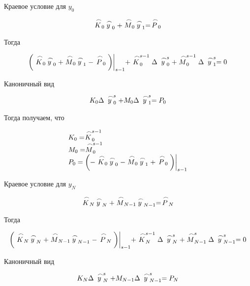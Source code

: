 \begin{enumerate}
    Краевое условие для $y_0$

    \begin{equation*}
        \LittleCap{K}_0 \LittleCap{y}_0 + \LittleCap{M}_0 \LittleCap{y}_1 = \LittleCap{P}_0
    \end{equation*}

    Тогда

    \begin{equation*}
        \bigg( \LittleCap{K}_0 \LittleCap{y}_0 + \LittleCap{M}_0 \LittleCap{y}_1 - \LittleCap{P}_0 \bigg) \bigg|_{s-1} + \LittleCap{K}_0^{s-1} \Delta \LittleCap{y}_0^s + \LittleCap{M}_0^{s-1}\Delta \LittleCap{y}_1^s = 0
    \end{equation*}

    Каноничный вид

    \begin{equation*}
        K_0 \Delta \LittleCap{y}_0^s + M_0 \Delta \LittleCap{y}_1^s = P_0
    \end{equation*}

    Тогда получаем, что

    \begin{equation*}
        \begin{matrix*}[l]
            K_0 = \LittleCap{K}_0^{s-1} \\
            M_0 = \LittleCap{M}_0^{s-1} \\
            P_0 = \bigg( - \LittleCap{K}_0 \LittleCap{y}_0 - \LittleCap{M}_0 \LittleCap{y}_1 + \LittleCap{P}_0 \bigg) \bigg|_{s-1} \\
        \end{matrix*}
    \end{equation*}

    Краевое условие для $y_N$

    \begin{equation*}
        \LittleCap{K}_N \LittleCap{y}_N + \LittleCap{M}_{N-1} \LittleCap{y}_{N-1} = \LittleCap{P}_N
    \end{equation*}

    Тогда

    \begin{equation*}
        \bigg( \LittleCap{K}_N \LittleCap{y}_N + \LittleCap{M}_{N-1} \LittleCap{y}_{N-1} - \LittleCap{P}_N \bigg) \bigg|_{s-1} + \LittleCap{K}_N^{s-1} \Delta \LittleCap{y}_N^s+ \LittleCap{M}_{N-1}^s \Delta \LittleCap{y}_{N-1}^s = 0
    \end{equation*}

    Каноничный вид

    \begin{equation*}
        K_N \Delta \LittleCap{y}_N^s + M_{N-1} \Delta \LittleCap{y}_{N-1}^s = P_N
    \end{equation*}


\end{enumerate}
